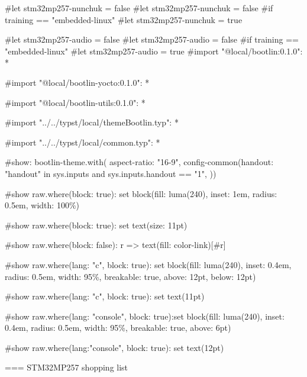 #let stm32mp257-nunchuk = false
#let stm32mp257-nunchuk = false
#if training == "embedded-linux" {#let stm32mp257-nunchuk = true}

#let stm32mp257-audio = false
#let stm32mp257-audio = false
#if training == "embedded-linux" {#let stm32mp257-audio = true}
#import "@local/bootlin:0.1.0": *

#import "@local/bootlin-yocto:0.1.0": *

#import "@local/bootlin-utils:0.1.0": *

#import "../../typst/local/themeBootlin.typ": *

#import "../../typst/local/common.typ": *

#show: bootlin-theme.with( aspect-ratio: "16-9", config-common(handout: "handout" in sys.inputs and sys.inputs.handout == "1", ))

#show raw.where(block: true): set block(fill: luma(240), inset: 1em, radius: 0.5em, width: 100\%)

#show raw.where(block: true): set text(size: 11pt)

#show raw.where(block: false): r => text(fill: color-link)[#r]

#show raw.where(lang: "c", block: true): set block(fill: luma(240), inset: 0.4em, radius: 0.5em, width: 95\%, breakable: true, above: 12pt, below: 12pt)

#show raw.where(lang: "c", block: true): set text(11pt)

#show raw.where(lang: "console", block: true):set block(fill: luma(240), inset: 0.4em, radius: 0.5em, width: 95\%, breakable: true, above: 6pt)

#show raw.where(lang:"console", block: true): set text(12pt)

=== STM32MP257 shopping list
  \footnotesize
  
